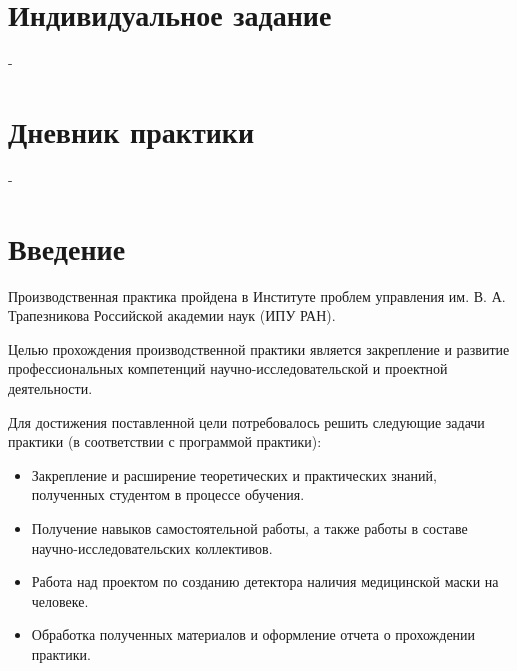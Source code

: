 \documentclass[a4paper,14pt]{article}
\begin{document}
	 
	
	\tableofcontents
	
	\pagebreak
	\section{Индивидуальное задание}
	
	\pagebreak
	
	-
	
	\pagebreak
	
	\section{Дневник практики}
	
	\pagebreak
	
	-
	
	\pagebreak
	
	
	\section{Введение}
	
	Производственная практика пройдена в Институте проблем управления им. В. А. Трапезникова Российской академии наук (ИПУ РАН).
	
	Целью прохождения производственной практики является закрепление и развитие профессиональных компетенций научно-исследовательской и проектной деятельности.
	
	Для достижения поставленной цели потребовалось решить следующие задачи практики (в соответствии с программой практики):
	\begin{itemize}
		\item Закрепление и расширение теоретических и практических знаний, полученных студентом в процессе обучения.
		
		
		\item Получение навыков самостоятельной работы, а также работы в составе научно-исследовательских коллективов.
		
		\item Работа над проектом по созданию детектора наличия медицинской маски на человеке.
		
		\item Обработка полученных материалов и оформление отчета о прохождении практики.
	\end{itemize}
	
\end{document}
